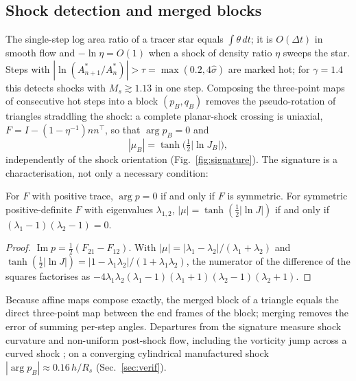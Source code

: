 \documentclass[11pt]{article}
\theoremstyle{definition}\newtheorem{definition}{Definition}\theoremstyle{remark}\newtheorem{remark}{Remark}
\newcommand{\im}{\operatorname{Im}}\newcommand{\re}{\operatorname{Re}}
\begin{document}
\subsection{Shock detection and merged blocks}\label{sec:shock}
The single-step log area ratio of a tracer star equals $\int\theta\,dt$; it is $O(\Delta t)$ in smooth flow and $-\ln\eta=O(1)$ when a shock of density ratio $\eta$ sweeps the star. Steps with $|\ln(A^\ast_{n+1}/A^\ast_n)|>\tau=\max(0.2,4\hat\sigma)$ are marked hot; for $\gamma=1.4$ this detects shocks with $M_s\gtrsim1.13$ in one step. Composing the three-point maps of consecutive hot steps into a block $(p_B,q_B)$ removes the pseudo-rotation of triangles straddling the shock: a complete planar-shock crossing is uniaxial, $F=I-(1-\eta^{-1})nn^\top$, so that $\arg p_B=0$ and
\begin{equation}
|\mu_B|=\tanh\big(\tfrac12|\ln J_B|\big),
\end{equation}
independently of the shock orientation (Fig.~\ref{fig:signature}). The signature is a characterisation, not only a necessary condition:
\begin{proposition}\label{prop:sig}
For $F$ with positive trace, $\arg p=0$ if and only if $F$ is symmetric. For symmetric positive-definite $F$ with eigenvalues $\lambda_{1,2}$, $|\mu|=\tanh(\frac12|\ln J|)$ if and only if $(\lambda_1-1)(\lambda_2-1)=0$.
\end{proposition}
\begin{proof}
$\im p=\frac12(F_{21}-F_{12})$. With $|\mu|=|\lambda_1-\lambda_2|/(\lambda_1+\lambda_2)$ and $\tanh(\frac12|\ln J|)=|1-\lambda_1\lambda_2|/(1+\lambda_1\lambda_2)$, the numerator of the difference of the squares factorises as $-4\lambda_1\lambda_2(\lambda_1-1)(\lambda_1+1)(\lambda_2-1)(\lambda_2+1)$.
\end{proof}
Because affine maps compose exactly, the merged block of a triangle equals the direct three-point map between the end frames of the block; merging removes the error of summing per-step angles. Departures from the signature measure shock curvature and non-uniform post-shock flow, including the vorticity jump across a curved shock \citep{Hayes1957}; on a converging cylindrical manufactured shock $|\arg p_B|\approx0.16\,h/R_s$ (Sec.~\ref{sec:verif}).
\end{document}
